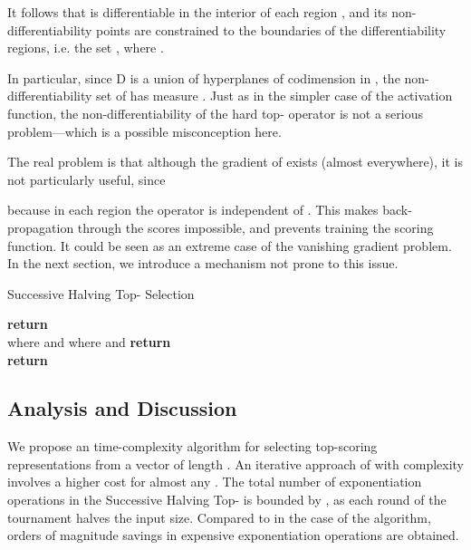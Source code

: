 \documentclass{article}
\begin{document}
It follows that  is differentiable in the interior of each region , and its non-differentiability points are constrained to the boundaries of the differentiability regions, i.e. the set , where .

In particular, since D is a union of hyperplanes of codimension  in , the non-differentiability set of  has measure . Just as in the simpler case of the  activation function, the non-differentiability of the hard top- operator is not a serious problem---which is a possible misconception here.

The real problem is that although the gradient of  exists (almost everywhere), it is not particularly useful, since

because in each region  the operator  is independent of . This makes back-propagation through the scores impossible, and prevents training the scoring function. It could be seen as an extreme case of the vanishing gradient problem.
In the next section, we introduce a mechanism not prone to this issue.

\begin{algorithm}
    \caption{Successive Halving Top- Selection}
    \begin{algorithmic}[1]
    \For{}
    \State 
    \State 
    \EndFor
    \State \textbf{return} 
    \EndProcedure\\
    
    
    \State  where  and 
    \State  where  and  \State \textbf{return} 
    \EndProcedure\\
    
    \State  {}
    \State  {}
    \State   
    \State 
    \For{}
        \State 
\State 
        \State 
    \EndFor
    \State \textbf{return} 
    \EndProcedure
    \end{algorithmic}
    \label{algo-soft-topk}
\end{algorithm}


\subsection{Analysis and Discussion}
We propose an  time-complexity algorithm for selecting  top-scoring representations from a vector of length . An iterative approach of \citet{goyal2017continuous} with  complexity involves a higher cost for almost any . The total number of exponentiation operations in the Successive Halving Top- is bounded by , as each round of the tournament halves the input size. Compared to  in the case of the \citet{goyal2017continuous} algorithm, orders of magnitude savings in expensive exponentiation operations are obtained. 
\end{document}
